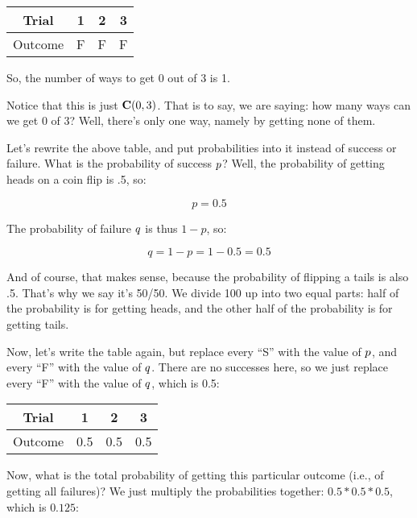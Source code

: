 \documentclass[../../../main.tex]{subfiles}
\begin{document}
\begin{center}
  \begin{tabular}{| c | c | c | c |}
    \hline
    \textbf{Trial} & \textbf{1} & \textbf{2} & \textbf{3} \\ \hline
    Outcome & F & F & F \\ \hline
  \end{tabular}
\end{center}

\noindent
So, the number of ways to get 0 out of 3 is 1. 

Notice that this is just $\mathbf{C}(0, 3)$. That is to say, we are saying: how many ways can we get 0 of 3? Well, there's only one way, namely by getting none of them.

Let's rewrite the above table, and put probabilities into it instead of success or failure. What is the probability of success $\success/$? Well, the probability of getting heads on a coin flip is .5, so:

\begin{equation*}
    p = 0.5
\end{equation*}

\noindent
The probability of failure $\failure/$ is thus $1 - p$, so:

\begin{equation*}
    q = 1 - p = 1 - 0.5 = 0.5
\end{equation*}

\noindent
And of course, that makes sense, because the probability of flipping a tails is also .5. That's why we say it's 50/50. We divide 100 up into two equal parts: half of the probability is for getting heads, and the other half of the probability is for getting tails.

Now, let's write the table again, but replace every ``S'' with the value of $\success/$, and every ``F'' with the value of $\failure/$. There are no successes here, so we just replace every ``F'' with the value of $\failure/$, which is 0.5:

\begin{center}
  \begin{tabular}{| c | c | c | c |}
    \hline
    \textbf{Trial} & \textbf{1} & \textbf{2} & \textbf{3} \\ \hline
    Outcome & 0.5 & 0.5 & 0.5 \\ \hline
  \end{tabular}
\end{center}

\noindent
Now, what is the total probability of getting this particular outcome (i.e., of getting all failures)? We just multiply the probabilities together: $0.5 * 0.5 * 0.5$, which is $0.125$:
\end{document}
